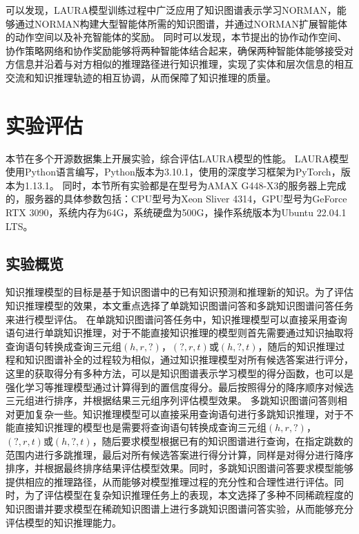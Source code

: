 \documentclass[algorithmlist, AutoFakeBold, AutoFakeSlant, figurelist, tablelist, nomlist, engineering, openany]{seuthesix} %
\begin{document}
可以发现，LAURA模型训练过程中广泛应用了知识图谱表示学习NORMAN，能够通过NORMAN构建大型智能体所需的知识图谱，并通过NORMAN扩展智能体的动作空间以及补充智能体的奖励。
同时可以发现，本节提出的协作动作空间、协作策略网络和协作奖励能够将两种智能体结合起来，确保两种智能体能够接受对方信息并沿着与对方相似的推理路径进行知识推理，实现了实体和层次信息的相互交流和知识推理轨迹的相互协调，从而保障了知识推理的质量。

\section{实验评估}
本节在多个开源数据集上开展实验，综合评估LAURA模型的性能。
LAURA模型使用Python语言编写，Python版本为3.10.1，使用的深度学习框架为PyTorch，版本为1.13.1。
同时，本节所有实验都是在型号为AMAX G448-X3的服务器上完成的，服务器的具体参数包括：CPU型号为Xeon Sliver 4314，GPU型号为GeForce RTX 3090，系统内存为64G，系统硬盘为500G，操作系统版本为Ubuntu 22.04.1 LTS。

\subsection{实验概览}
知识推理模型的目标是基于知识图谱中的已有知识预测和推理新的知识。为了评估知识推理模型的效果，本文重点选择了单跳知识图谱问答和多跳知识图谱问答任务来进行模型评估。
在单跳知识图谱问答任务中，知识推理模型可以直接采用查询语句进行单跳知识推理，对于不能直接知识推理的模型则首先需要通过知识抽取将查询语句转换成查询三元组$(h, r, ?)$，$(?, r, t)$或$(h, ?, t)$，随后的知识推理过程和知识图谱补全的过程较为相似，通过知识推理模型对所有候选答案进行评分，这里的获取得分有多种方法，可以是知识图谱表示学习模型的得分函数，也可以是强化学习等推理模型通过计算得到的置信度得分。最后按照得分的降序顺序对候选三元组进行排序，并根据结果三元组序列评估模型效果。
多跳知识图谱问答则相对更加复杂一些。知识推理模型可以直接采用查询语句进行多跳知识推理，对于不能直接知识推理的模型也是需要将查询语句转换成查询三元组$(h, r, ?)$，$(?, r, t)$或$(h, ?, t)$，随后要求模型根据已有的知识图谱进行查询，在指定跳数的范围内进行多跳推理，最后对所有候选答案进行得分计算，同样是对得分进行降序排序，并根据最终排序结果评估模型效果。同时，多跳知识图谱问答要求模型能够提供相应的推理路径，从而能够对模型推理过程的充分性和合理性进行评估。同时，为了评估模型在复杂知识推理任务上的表现，本文选择了多种不同稀疏程度的知识图谱并要求模型在稀疏知识图谱上进行多跳知识图谱问答实验，从而能够充分评估模型的知识推理能力。
\end{document}
